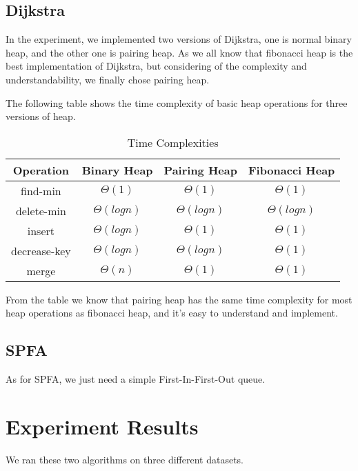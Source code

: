 \documentclass[a4paper, margin=15in]{article}
\begin{document}
\subsection{Dijkstra}

In the experiment, we implemented two versions of Dijkstra,
one is normal binary heap, and the other one is pairing heap.
As we all know that fibonacci heap is the best implementation of Dijkstra,
but considering of the complexity and understandability, we finally chose pairing heap.

The following table shows the time complexity of basic heap operations for three versions of heap.

\begin{table}[!ht]
\centering
\begin{tabular}{|c|c|c|c|}
\hline
Operation       & Binary Heap       & Pairing Heap      & Fibonacci Heap    \\ \hline
find-min        & $\Theta(1)$       & $\Theta(1)$       & $\Theta(1)$       \\ \hline
delete-min      & $\Theta(log n)$   & $\Theta(log n)$   & $\Theta(log n)$   \\ \hline
insert          & $\Theta(log n)$   & $\Theta(1)$       & $\Theta(1)$       \\ \hline
decrease-key    & $\Theta(log n)$   & $\Theta(log n)$   & $\Theta(1)$       \\ \hline
merge           & $\Theta(n)$       & $\Theta(1)$       & $\Theta(1)$       \\ \hline
\end{tabular}
\caption{Time Complexities}
\label{time}
\end{table}

From the table we know that pairing heap has the same time complexity
for most heap operations as fibonacci heap, and it's easy to understand and implement.

\subsection{SPFA}

As for SPFA, we just need a simple First-In-First-Out queue.

\section{Experiment Results}

We ran these two algorithms on three different datasets.
\end{document}
